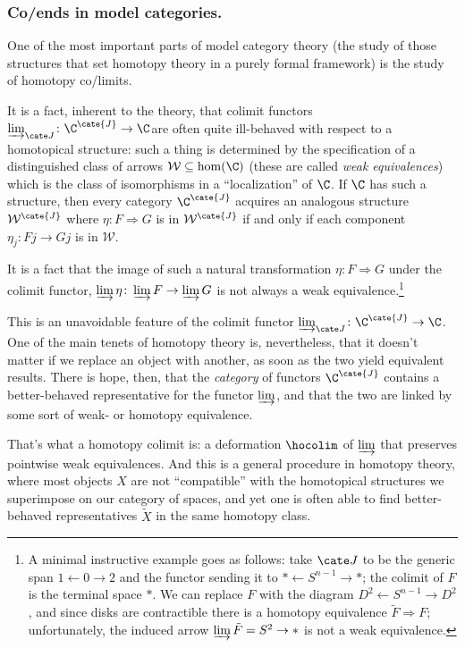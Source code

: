 \subsubsection{\bf Co/ends in model categories.}\label{coends-in-model}
One of the most important parts of model category theory (the study of those structures that set homotopy theory in a purely formal framework) is the study of homotopy co/limits.

It is a fact, inherent to the theory, that colimit functors $\varinjlim_{\cate J}\colon \C^\cate{J}\to \C$are often quite ill-behaved with respect to a homotopical structure: such a thing is determined by the specification of a distinguished class of arrows $\mathcal W\subseteq \hom(\C)$ (these are called \emph{weak equivalences}) which is the class of isomorphisms in a ``localization'' of $\C$. If $\C$ has such a structure, then every category $\C^{\cate{J}}$ acquires an analogous structure $\mathcal{W}^\cate{J}$ where $\eta\colon F\Rightarrow G$ is in $\mathcal{W}^\cate{J}$ if and only if each component $\eta_j\colon Fj\to Gj$ is in $\mathcal W$. 

It is a fact that the image of such a natural transformation $\eta\colon F\Rightarrow G$ under the colimit functor, $\varinjlim\eta\colon \varinjlim F\to \varinjlim G$ is not always a weak equivalence.\footnote{A minimal instructive example goes as follows: take $\cate J$ to be the generic span $1\leftarrow 0\to 2$ and the functor sending it to $* \leftarrow S^{n-1}\to *$; the colimit of $F$ is the terminal space $*$. We can replace $F$ with the diagram $D^2 \leftarrow S^{n-1}\to D^2$, and since disks are contractible there is a homotopy equivalence $\tilde F \Rightarrow F$; unfortunately, the induced arrow $\varinjlim \tilde F = S^2\to *$ is not a weak equivalence.}

This is an unavoidable feature of the colimit functor $\varinjlim_{\cate J}\colon \C^\cate{J}\to \C$. One of the main tenets of homotopy theory is, nevertheless, that it doesn't matter if we replace an object with another, as soon as the two yield equivalent results. There is hope, then, that the \emph{category} of functors $\C^\cate{J}$ contains a better-behaved representative for the functor $\varinjlim$, and that the two are linked by some sort of weak- or homotopy equivalence.

That's what a homotopy colimit is: a deformation $\hocolim$ of $\varinjlim$ that preserves pointwise weak equivalences. And this is a general procedure in homotopy theory, where most objects $X$ are not ``compatible'' with the homotopical structures we superimpose on our category of spaces, and yet one is often able to find better-behaved representatives $\tilde X$ in the same homotopy class.

